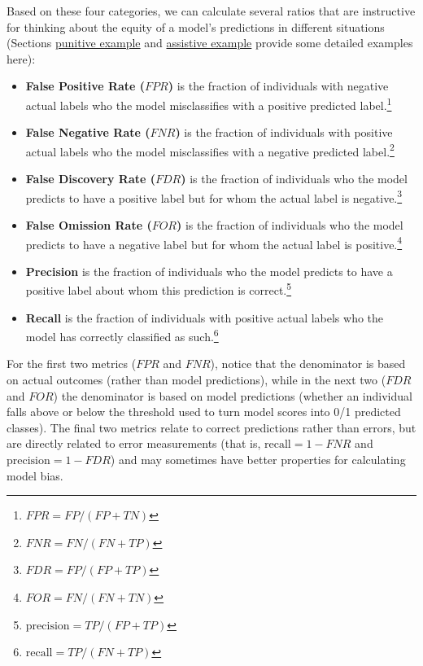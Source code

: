 \documentclass[]{krantz}
\begin{document}
Based on these four categories, we can calculate several ratios that are
instructive for thinking about the equity of a model's predictions in
different situations (Sections
\protect\hyperlink{sec:punitiveexample}{punitive example} and
\protect\hyperlink{sec:assistiveexample}{assistive example} provide some
detailed examples here):

\begin{itemize}
\item
  \textbf{False Positive Rate (\(FPR\))} is the fraction of individuals
  with negative actual labels who the model misclassifies with a
  positive predicted label.\footnote{\(FPR = FP / (FP+TN)\)}
\item
  \textbf{False Negative Rate (\(FNR\))} is the fraction of individuals
  with positive actual labels who the model misclassifies with a
  negative predicted label.\footnote{\(FNR = FN / (FN+TP)\)}
\item
  \textbf{False Discovery Rate (\(FDR\))} is the fraction of individuals
  who the model predicts to have a positive label but for whom the
  actual label is negative.\footnote{\(FDR = FP / (FP+TP)\)}
\item
  \textbf{False Omission Rate (\(FOR\))} is the fraction of individuals
  who the model predicts to have a negative label but for whom the
  actual label is positive.\footnote{\(FOR = FN / (FN+TN)\)}
\item
  \textbf{Precision} is the fraction of individuals who the model
  predicts to have a positive label about whom this prediction is
  correct.\footnote{\(\textrm{precision} = TP / (FP+TP)\)}
\item
  \textbf{Recall} is the fraction of individuals with positive actual
  labels who the model has correctly classified as such.\footnote{\(\textrm{recall} = TP / (FN+TP)\)}
\end{itemize}

For the first two metrics (\(FPR\) and \(FNR\)), notice that the
denominator is based on actual outcomes (rather than model predictions),
while in the next two (\(FDR\) and \(FOR\)) the denominator is based on
model predictions (whether an individual falls above or below the
threshold used to turn model scores into 0/1 predicted classes). The
final two metrics relate to correct predictions rather than errors, but
are directly related to error measurements (that is,
\(\textrm{recall} = 1-FNR\) and \(\textrm{precision} = 1-FDR\)) and may
sometimes have better properties for calculating model bias.
\end{document}
